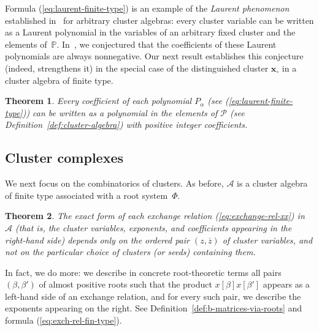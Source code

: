 \documentclass[letterpaper]{amsart}
\numberwithin{equation}{section}
\newtheorem{theorem}{Theorem}[section]
\theoremstyle{definition}
\def\AA{\mathcal{A}}
\def\PP{\mathbb{P}}
\def\xx{\mathbf{x}}
\begin{document}
Formula (\ref{eq:laurent-finite-type}) is an example of 
the \emph{Laurent phenomenon} established in~\cite{fz-clust1} for 
arbitrary cluster algebras: 
every cluster variable can be written as a Laurent polynomial in the 
variables of an arbitrary fixed cluster and the elements of~$\PP$. 
In~\cite{fz-clust1}, we conjectured that the coefficients of these Laurent 
polynomials are always nonnegative. 
Our next result establishes this 
conjecture (indeed, strengthens it) in the special case of the 
distinguished cluster $\xx_\circ$ in a cluster algebra of finite type. 
 
\begin{theorem} 
\label{th:cluster-variable-denominators-2} 
Every coefficient of each polynomial $P_\alpha$ 
(see {\rm (\ref{eq:laurent-finite-type})}) 
can be written as a polynomial in the elements of $\mathcal{P}$ 
(see Definition~\ref{def:cluster-algebra}) with positive integer 
coefficients. 
\end{theorem} 
 
 
 
 
 
 
\subsection{Cluster complexes} 
\label{sec:cluster-complexes} 
We next focus on the combinatorics of clusters. 
As before, $\AA$ is a cluster algebra of finite type 
associated with a root system~$\Phi$. 
 
\begin{theorem} 
\label{th:exch-rel-dep-on-vars-only} 
The exact form of each exchange relation 
{\rm(\ref{eq:exchange-rel-xx})} in $\AA$ 
(that is, the cluster variables, exponents, and coefficients appearing in 
the right-hand side) 
\linebreak[3] 
depends only on the ordered pair $(z,\overline z)$ of cluster 
variables, and not on the particular choice of clusters (or seeds) containing them. 
\end{theorem} 
 
In fact, we do more: we describe  in concrete root-theoretic 
terms all pairs $(\beta, \beta')$ of almost positive 
roots such that the product $x[\beta] x[\beta']$ appears as a 
left-hand side of an exchange relation, and 
for every such pair, we describe the exponents 
appearing on the right. 
See %
Definition~\ref{def:b-matrices-via-roots} and formula (\ref{eq:exch-rel-fin-type}). 
 
\end{document}
